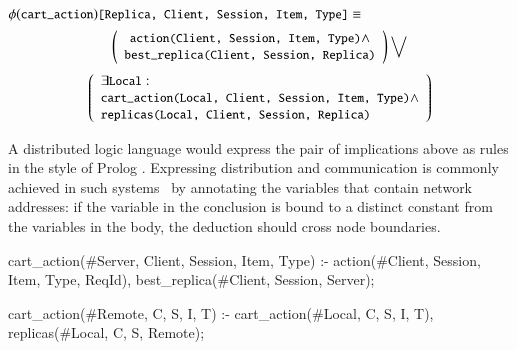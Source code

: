 \noindent{}$\phi(\dedalus{cart\_action})\dedalus{[Replica, Client, Session, Item, Type]} \equiv$
$$
\left(
\begin{array}{c}
\dedalus{action(Client, Session, Item, Type)} \land\\
\dedalus{best\_replica(Client, Session, Replica)}
\end{array}
\right) \bigvee
$$
$$
\left(
\begin{array}{l}
\exists \dedalus{Local}:\\
\dedalus{cart\_action(Local, Client, Session, Item, Type)} \land\\
\dedalus{replicas(Local, Client, Session, Replica)}
\end{array}
\right)
$$

A distributed logic language would express the pair of implications above as rules
in the style of Prolog .  Expressing distribution and communication
is commonly achieved in such systems~\cite{Loo2009-CACM} by annotating the variables that 
contain network addresses: if the variable in the conclusion is bound to a distinct constant from the variables in
the body, the deduction should cross node boundaries.  

\begin{Dedalus}
cart\_action(#Server, Client, Session, Item, Type) :-
  action(#Client, Session, Item, Type, ReqId),
  best_replica(#Client, Session, Server);

cart\_action(#Remote, C, S, I, T) :-
  cart\_action(#Local, C, S, I, T),
  replicas(#Local, C, S, Remote);
\end{Dedalus}

